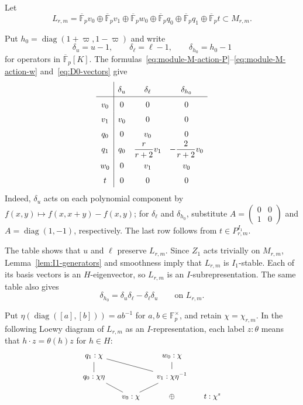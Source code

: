 \documentclass[10pt]{article}
\theoremstyle{plain}
\theoremstyle{definition}
\theoremstyle{remark}
\newcommand{\Fp}{\mathbb{F}_p}
\newcommand{\Fpbar}{\overline{\mathbb{F}}_p}
\begin{document}
Let
\begin{equation}\label{eq:module-L-definition}
L_{r,m}=\Fpbar v_0\oplus\Fpbar v_1\oplus\Fpbar w_0
\oplus\Fpbar q_0\oplus\Fpbar q_1\oplus\Fpbar t
\subset M_{r,m}.
\end{equation}

Put $h_0=\operatorname{diag}(1+\varpi,1-\varpi)$ and write
\[
\delta_u=u-1,
\qquad
\delta_{\ell}=\ell-1,
\qquad
\delta_{h_0}=h_0-1
\]
for operators in $\Fpbar[K]$. The formulas~\eqref{eq:module-M-action-P}--\eqref{eq:module-M-action-w} and~\eqref{eq:D0-vectors} give
\begin{equation}\label{eq:D0-operator-actions}
\renewcommand{\arraystretch}{1.5}
\begin{array}{c|ccc}
 & \delta_u & \delta_{\ell} & \delta_{h_0} \\
\hline
v_0 & 0 & 0 & 0 \\
v_1 & v_0 & 0 & 0 \\
q_0 & 0 & v_0 & 0 \\
q_1 & q_0 & \dfrac{r}{r+2}v_1 & -\dfrac{2}{r+2}v_0 \\
w_0 & 0 & v_1 & v_0 \\
t & 0 & 0 & 0
\end{array}
\end{equation}
Indeed, $\delta_u$ acts on each polynomial component by $f(x,y)\mapsto f(x,x+y)-f(x,y)$; for $\delta_{\ell}$ and $\delta_{h_0}$, substitute $A=\begin{pmatrix}0&0\\1&0\end{pmatrix}$ and $A=\operatorname{diag}(1,-1)$, respectively. The last row follows from $t\in P_{r,m}^{I_1}$.

The table shows that $u$ and $\ell$ preserve $L_{r,m}$. Since $Z_1$ acts trivially on $M_{r,m}$, Lemma~\ref{lem:I1-generators} and smoothness imply that $L_{r,m}$ is $I_1$-stable. Each of its basis vectors is an $H$-eigenvector, so $L_{r,m}$ is an $I$-subrepresentation. The same table also gives
\[
\delta_{h_0}=\delta_u\delta_{\ell}-\delta_{\ell}\delta_u
\qquad\text{on }L_{r,m}.
\]

Put $\eta(\operatorname{diag}([a],[b]))=ab^{-1}$ for $a,b\in\Fp^\times$, and retain $\chi=\chi_{r,m}$. In the following Loewy diagram of $L_{r,m}$ as an $I$-representation, each label $z:\theta$ means that $h\cdot z=\theta(h)z$ for $h\in H$:
\[
\begin{tikzcd}[row sep=small, column sep=small, cells={nodes={font=\small}}]
q_1:\chi \arrow[d, no head] \arrow[drr, no head] & & w_0:\chi \arrow[d, no head] & \\
q_0:\chi\eta \arrow[dr, no head] & & v_1:\chi\eta^{-1} \arrow[dl, no head] & \\
& v_0:\chi & \oplus & t:\chi^s
\end{tikzcd}
\]
\end{document}
